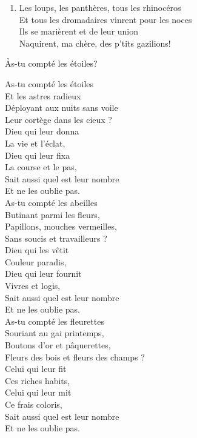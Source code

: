 \documentclass{novel}
\begin{document}
{\begin{minipage}[t][0.53\textheight][t]{\textwidth}
\begin{multicols}{2}
\begin{enumerate}
\item Les loups, les panthères, tous les rhinocéros \\
Et tous les dromadaires vinrent pour les noces \\
Ils se marièrent et de leur union \\
Naquirent, ma chère, des p'tits gazilions!
\end{enumerate}
\end{multicols}
\end{minipage}

\begin{minipage}[t][0.5\textheight][t]{\textwidth}
\vspace{0.00\textheight}
\h*{As-tu compté les étoiles?}
\begin{multicols}{2}


As-tu compté les étoiles \\
Et les astres radieux \\
Déployant aux nuits sans voile \\
Leur cortège dans les cieux ? \\
Dieu qui leur donna \\
La vie et l’éclat, \\
Dieu qui leur fixa \\
La course et le pas, \\
Sait aussi quel est leur nombre \\
Et ne les oublie pas. \\


As-tu compté les abeilles \\
Butinant parmi les fleurs, \\
Papillons, mouches vermeilles, \\
Sans soucis et travailleurs ? \\
Dieu qui les vêtit \\
Couleur paradis, \\
Dieu qui leur fournit \\
Vivres et logis, \\
Sait aussi quel est leur nombre \\
Et ne les oublie pas. \\

As-tu compté les fleurettes \\
Souriant au gai printemps, \\
Boutons d’or et pâquerettes, \\
Fleurs des bois et fleurs des champs ? \\
Celui qui leur fit \\
Ces riches habits, \\
Celui qui leur mit \\
Ce frais coloris, \\
Sait aussi quel est leur nombre \\
Et ne les oublie pas. \\


\end{multicols}
\end{minipage}}
\end{document}
